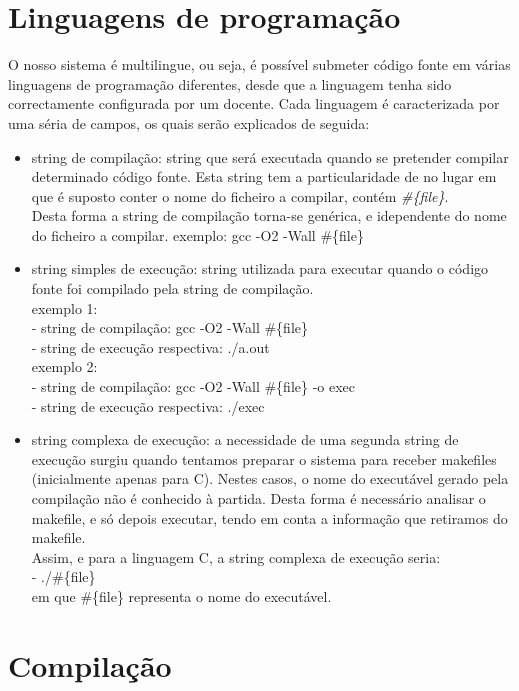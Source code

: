 \section{Linguagens de programação}\label{sec lps}
O nosso sistema é multilingue, ou seja, é possível submeter código fonte em várias linguagens de programação diferentes, desde que 
a linguagem tenha sido correctamente configurada por um docente.
Cada linguagem é caracterizada por uma séria de campos, os quais serão explicados de seguida:
\begin{itemize}
\item string de compilação: string que será executada quando se pretender compilar determinado código fonte. Esta string tem a
particularidade de no lugar em que é suposto conter o nome do ficheiro a compilar, contém \textit{\#\{file\}}.\\
Desta forma a string de compilação torna-se genérica, e idependente do nome do ficheiro a compilar.
exemplo: gcc -O2 -Wall \#\{file\}

\item string simples de execução: string utilizada para executar quando o código fonte foi compilado pela string de compilação.\\
exemplo 1:\\ 
- string de compilação: gcc -O2 -Wall \#\{file\}\\
- string de execução respectiva: ./a.out\\
exemplo 2:\\
- string de compilação: gcc -O2 -Wall \#\{file\} -o exec\\
- string de execução respectiva: ./exec\\

\item string complexa de execução: a necessidade de uma segunda string de execução surgiu quando tentamos preparar o sistema para receber makefiles (inicialmente apenas para C). Nestes casos, o nome do executável gerado pela compilação não é conhecido à partida.
Desta forma é necessário analisar o makefile, e só depois executar, tendo em conta a informação que retiramos do makefile.\\
Assim, e para a linguagem C, a string complexa de execução seria:\\
- ./\#\{file\}\\
em que \#\{file\} representa o nome do executável.

\end{itemize}


\section{Compilação}\label{sec comp}

